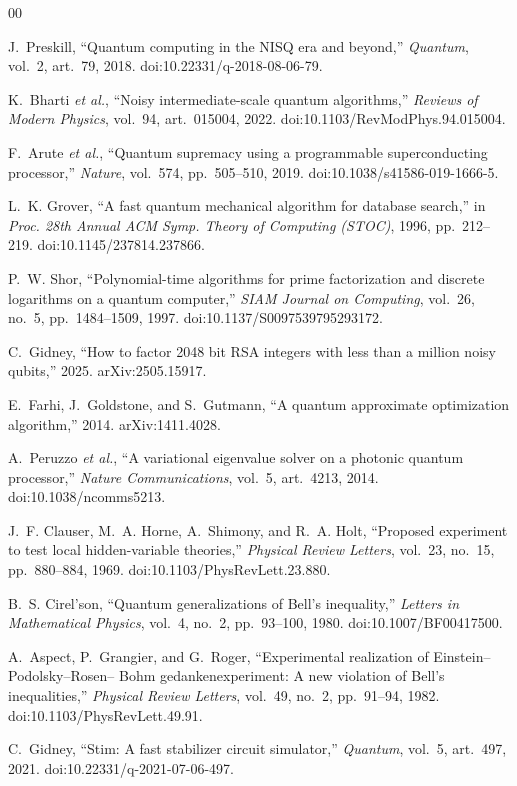 \documentclass[journal]{IEEEtran}
\begin{document}
\begin{thebibliography}{00}

 J.~Preskill, ``Quantum computing in the NISQ era and beyond,'' \emph{Quantum}, vol.~2,
art.~79, 2018. doi:10.22331/q-2018-08-06-79.

 K.~Bharti \emph{et al.}, ``Noisy intermediate-scale quantum algorithms,'' \emph{Reviews of
Modern Physics}, vol.~94, art.~015004, 2022. doi:10.1103/RevModPhys.94.015004.

 F.~Arute \emph{et al.}, ``Quantum supremacy using a programmable superconducting processor,''
\emph{Nature}, vol.~574, pp.~505--510, 2019. doi:10.1038/s41586-019-1666-5.

 L.~K. Grover, ``A fast quantum mechanical algorithm for database search,'' in \emph{Proc. 28th
Annual ACM Symp. Theory of Computing (STOC)}, 1996, pp.~212--219. doi:10.1145/237814.237866.

 P.~W. Shor, ``Polynomial-time algorithms for prime factorization and discrete logarithms on a
quantum computer,'' \emph{SIAM Journal on Computing}, vol.~26, no.~5, pp.~1484--1509, 1997.
doi:10.1137/S0097539795293172.

 C.~Gidney, ``How to factor 2048 bit RSA integers with less than a million noisy qubits,'' 2025.
arXiv:2505.15917.

 E.~Farhi, J.~Goldstone, and S.~Gutmann, ``A quantum approximate optimization algorithm,'' 2014.
arXiv:1411.4028.

 A.~Peruzzo \emph{et al.}, ``A variational eigenvalue solver on a photonic quantum processor,''
\emph{Nature Communications}, vol.~5, art.~4213, 2014. doi:10.1038/ncomms5213.

 J.~F. Clauser, M.~A. Horne, A.~Shimony, and R.~A. Holt, ``Proposed experiment to test local
hidden-variable theories,'' \emph{Physical Review Letters}, vol.~23, no.~15, pp.~880--884, 1969.
doi:10.1103/PhysRevLett.23.880.

 B.~S. Cirel'son, ``Quantum generalizations of Bell's inequality,'' \emph{Letters in
Mathematical Physics}, vol.~4, no.~2, pp.~93--100, 1980. doi:10.1007/BF00417500.

 A.~Aspect, P.~Grangier, and G.~Roger, ``Experimental realization of Einstein--Podolsky--Rosen--
Bohm gedankenexperiment: A new violation of Bell's inequalities,'' \emph{Physical Review Letters}, vol.~49,
no.~2, pp.~91--94, 1982. doi:10.1103/PhysRevLett.49.91.

 C.~Gidney, ``Stim: A fast stabilizer circuit simulator,'' \emph{Quantum}, vol.~5, art.~497, 2021.
doi:10.22331/q-2021-07-06-497.

\end{thebibliography}
\end{document}
